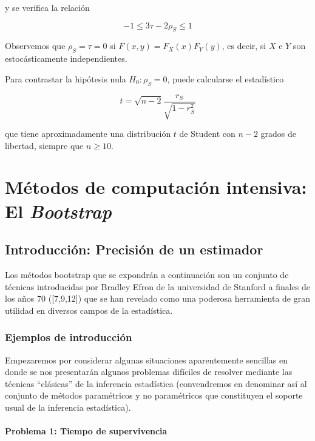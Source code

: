 \documentclass[
]{article}
\begin{document}
y se verifica la relación

\[
-1\leq 3\tau-2\rho_S\leq1
\]

Observemos que \(\rho_S=\tau=0\) si \(F(x,y)=F_X(x)F_Y(y)\), es decir, si \(X\) e \(Y\) son estocásticamente independientes.

Para contrastar la hipótesis nula \(H_0:\rho_S=0\), puede calcularse el estadístico

\[
t=\sqrt{n-2}\frac{r_S}{\sqrt{1-r_S^2}}
\]

que tiene aproximadamente una distribución \(t\) de Student con \(n-2\) grados de libertad, siempre que \(n\geq10\).

\newpage

\section{\texorpdfstring{Métodos de computación intensiva: El \emph{Bootstrap}}{Métodos de computación intensiva: El Bootstrap}}\label{muxe9todos-de-computaciuxf3n-intensiva-el-bootstrap}

\subsection{Introducción: Precisión de un estimador}\label{introducciuxf3n-precisiuxf3n-de-un-estimador}

Los métodos bootstrap que se expondrán a continuación son un conjunto de técnicas introducidas por Bradley Efron de la universidad de Stanford a finales de los años 70 ({[}7,9,12{]}) que se han revelado como una poderosa herramienta de gran utilidad en diversos campos de la estadística.

\subsubsection{Ejemplos de introducción}\label{ejemplos-de-introducciuxf3n}

Empezaremos por considerar algunas situaciones aparentemente sencillas en donde se nos presentarán algunos problemas difíciles de resolver mediante las técnicas ``clásicas'' de la inferencia estadística (convendremos en denominar así al conjunto de métodos paramétricos y no paramétricos que constituyen el soporte usual de la inferencia estadística).

\paragraph{Problema 1: Tiempo de supervivencia}\label{problema-1-tiempo-de-supervivencia}
\end{document}
